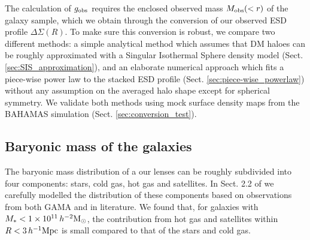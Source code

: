 \documentclass[usenatbib]{mnras}
\newcommand{\hmsun}{\,h^{-2} {\rm M_\odot}}
\newcommand{\hMpc}{\, h^{-1}{\rm{Mpc}} }
\newcommand*{\E}[1]{\times 10^{#1}}
\newcommand{\un}[1]{_{\rm #1}}
\begin{document}
The calculation of $g\un{obs}$ requires the enclosed observed mass $M\un{obs}(<r)$ of the galaxy sample, which we obtain through the conversion of our observed ESD profile \mbox{$\Delta\Sigma(R)$}. To make sure this conversion is robust, we compare two different methods: a simple analytical method which assumes that DM haloes can be roughly approximated with a Singular Isothermal Sphere density model (Sect. \ref{sec:SIS_approximation}), and an elaborate numerical approach which fits a piece-wise power law to the stacked ESD profile (Sect. \ref{sec:piece-wise_powerlaw}) without any assumption on the averaged halo shape except for spherical symmetry. We validate both methods using mock surface density maps from the BAHAMAS simulation (Sect. \ref{sec:conversion_test}).

\subsection{Baryonic mass of the galaxies}
\label{sec:baryonic_mass}

The baryonic mass distribution of a our lenses can be roughly subdivided into four components: stars, cold gas, hot gas and satellites. In Sect. 2.2 of \cite{brouwer2016} we carefully modelled the distribution of these components based on observations from both GAMA and in literature. We found that, for galaxies with $M_*<1\E{11}\hmsun$, the contribution from hot gas and satellites within $R<3 \hMpc$ is small compared to that of the stars and cold gas. 

\end{document}
